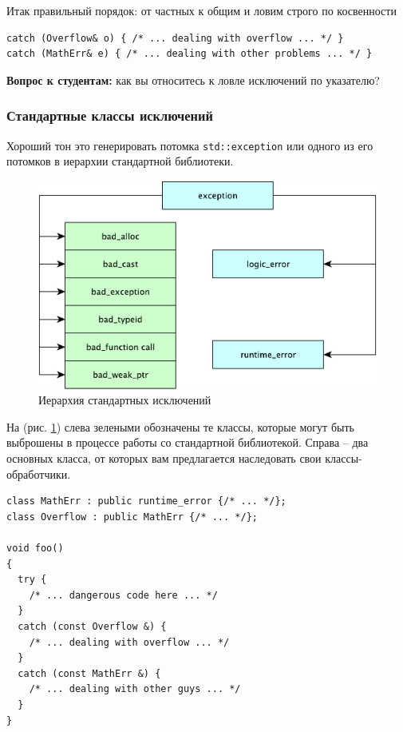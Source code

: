 \documentclass[a4paper,12pt,oneside]{article}
\newif\ifanswers
\begin{document}
Итак правильный порядок: от частных к общим и ловим строго по косвенности

\begin{lstlisting}
catch (Overflow& o) { /* ... dealing with overflow ... */ }
catch (MathErr& e) { /* ... dealing with other problems ... */ }
\end{lstlisting}

\textbf{Вопрос к студентам:} как вы относитесь к ловле исключений по указателю?

\ifanswers
Правильный ответ: плохо. Возникают сложные проблемы владения выделенным объектом.
\fi

\subsubsection{Стандартные классы исключений}\label{subsub:stanclasses}

Хороший тон это генерировать потомка \lstinline!std::exception! или одного из его потомков в иерархии стандартной библиотеки.

\begin{figure}[ht]
\centering
\includegraphics[width=1.0\textwidth]{illustrations/exc-hier-crop.pdf}
\caption{Иерархия стандартных исключений}
\label{fig:exc_hier}
\end{figure}

На (рис. \ref{fig:exc_hier}) слева зелеными обозначены те классы, которые могут быть выброшены в процессе работы со стандартной библиотекой. Справа -- два основных класса, от которых вам предлагается наследовать свои классы-обработчики.

\begin{lstlisting}
class MathErr : public runtime_error {/* ... */};
class Overflow : public MathErr {/* ... */};

void foo()
{
  try {
    /* ... dangerous code here ... */
  }
  catch (const Overflow &) {
    /* ... dealing with overflow ... */
  }
  catch (const MathErr &) {
    /* ... dealing with other guys ... */
  }
}
\end{lstlisting}
\end{document}
